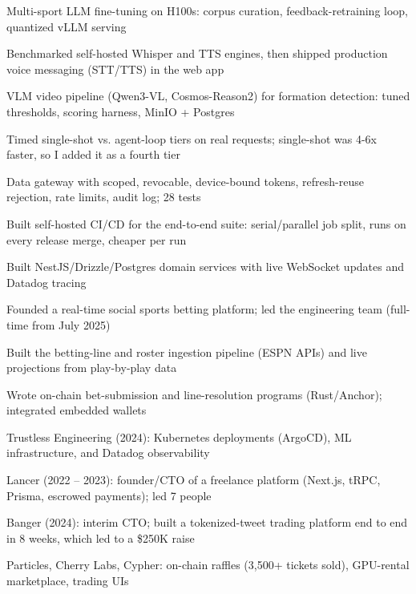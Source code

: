 \documentclass[print]{jack-resume}
\begin{document}
\begin{tightemize}
    \item Multi-sport LLM fine-tuning on H100s: corpus curation, feedback-retraining loop, quantized vLLM serving
    \item Benchmarked self-hosted Whisper and TTS engines, then shipped production voice messaging (STT/TTS) in the web app
    \item VLM video pipeline (Qwen3-VL, Cosmos-Reason2) for formation detection: tuned thresholds, scoring harness, MinIO + Postgres
    \item Timed single-shot vs. agent-loop tiers on real requests; single-shot was 4-6x faster, so I added it as a fourth tier
    \item Data gateway with scoped, revocable, device-bound tokens, refresh-reuse rejection, rate limits, audit log; 28 tests
    \item Built self-hosted CI/CD for the end-to-end suite: serial/parallel job split, runs on every release merge, cheaper per run
\end{tightemize}
\sectionsep

\begin{tightemize}
    \item Built NestJS/Drizzle/Postgres domain services with live WebSocket updates and Datadog tracing
    \item Founded a real-time social sports betting platform; led the engineering team (full-time from July 2025)
    \item Built the betting-line and roster ingestion pipeline (ESPN APIs) and live projections from play-by-play data
    \item Wrote on-chain bet-submission and line-resolution programs (Rust/Anchor); integrated embedded wallets
\end{tightemize}
\sectionsep

\begin{tightemize}
    \item Trustless Engineering (2024): Kubernetes deployments (ArgoCD), ML infrastructure, and Datadog observability
    \item Lancer (2022 – 2023): founder/CTO of a freelance platform (Next.js, tRPC, Prisma, escrowed payments); led 7 people
    \item Banger (2024): interim CTO; built a tokenized-tweet trading platform end to end in 8 weeks, which led to a \$250K raise
    \item Particles, Cherry Labs, Cypher: on-chain raffles (3,500+ tickets sold), GPU-rental marketplace, trading UIs
\end{tightemize}
\sectionsep
\end{document}
